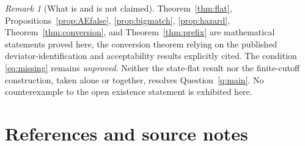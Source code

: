 \documentclass[11pt,a4paper]{article}
\numberwithin{equation}{section}
\theoremstyle{definition}
\theoremstyle{remark}
\newtheorem{remark}[theorem]{Remark}
\begin{document}
\begin{remark}[What is and is not claimed]
Theorem~\ref{thm:flat}, Propositions~\ref{prop:AEfalse},
\ref{prop:bigmatch}, \ref{prop:hazard},
Theorem~\ref{thm:conversion}, and Theorem~\ref{thm:prefix}
are mathematical statements proved here, the conversion theorem relying
on the published deviator-identification and acceptability results
explicitly cited. The condition \eqref{eq:missing} remains \emph{unproved}.
Neither the state-flat result nor the finite-cutoff construction, taken
alone or together, resolves Question~\ref{q:main}. No counterexample to
the open existence statement is exhibited here.
\end{remark}

\section*{References and source notes}
\end{document}
